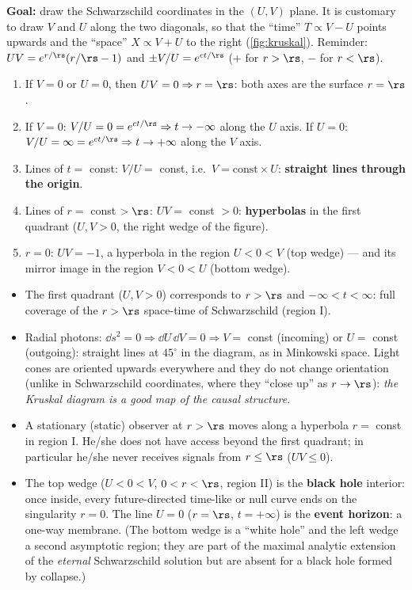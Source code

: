 \textbf{Goal:} draw the Schwarzschild coordinates in the $(U,V)$ plane. It is customary to draw $V$ and $U$ along the two diagonals, so that the ``time'' $T\propto V-U$ points upwards and the ``space'' $X\propto V+U$ to the right (\cref{fig:kruskal}). Reminder: $UV=e^{r/\rs}(r/\rs-1)$ and $\pm V/U=e^{ct/\rs}$ ($+$ for $r>\rs$, $-$ for $r<\rs$).
\begin{enumerate}
\item If $V=0$ or $U=0$, then $UV=0\Rightarrow r=\rs$: both axes are the surface $r=\rs$.
\item If $V=0$: $V/U=0=e^{ct/\rs}\Rightarrow t\to-\infty$ along the $U$ axis. If $U=0$: $V/U=\infty=e^{ct/\rs}\Rightarrow t\to+\infty$ along the $V$ axis.
\item Lines of $t=$ const: $V/U=$ const, i.e.\ $V=\text{const}\times U$: \textbf{straight lines through the origin}.
\item Lines of $r=$ const $>\rs$: $UV=$ const $>0$: \textbf{hyperbolas} in the first quadrant ($U,V>0$, the right wedge of the figure).
\item $r=0$: $UV=-1$, a hyperbola in the region $U<0<V$ (top wedge) --- and its mirror image in the region $V<0<U$ (bottom wedge).
\end{enumerate}
\begin{itemize}
\item The first quadrant ($U,V>0$) corresponds to $r>\rs$ and $-\infty<t<\infty$: full coverage of the $r>\rs$ space-time of Schwarzschild (region I).
\item Radial photons: $\dd s^2=0\Rightarrow\dd U\,\dd V=0\Rightarrow V=$ const (incoming) or $U=$ const (outgoing): straight lines at $45^\circ$ in the diagram, as in Minkowski space. Light cones are oriented upwards everywhere and they do not change orientation (unlike in Schwarzschild coordinates, where they ``close up'' as $r\to\rs$): \emph{the Kruskal diagram is a good map of the causal structure}.
\item A stationary (static) observer at $r>\rs$ moves along a hyperbola $r=$ const in region I. He/she does not have access beyond the first quadrant; in particular he/she never receives signals from $r\le\rs$ ($UV\le0$).
\item The top wedge ($U<0<V$, $0<r<\rs$, region II) is the \textbf{black hole} interior: once inside, every future-directed time-like or null curve ends on the singularity $r=0$. The line $U=0$ ($r=\rs$, $t=+\infty$) is the \textbf{event horizon}: a one-way membrane. (The bottom wedge is a ``white hole'' and the left wedge a second asymptotic region; they are part of the maximal analytic extension of the \emph{eternal} Schwarzschild solution but are absent for a black hole formed by collapse.)
\end{itemize}

